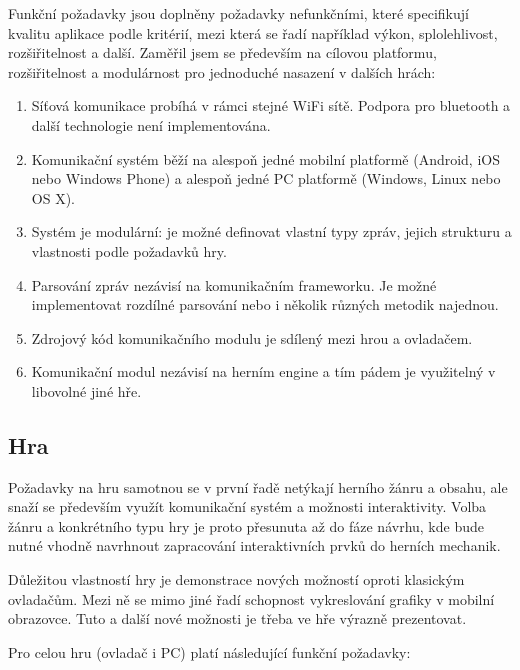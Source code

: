 \documentclass[thesis=B,czech,hidelinks]{FITthesis}[2012/06/26] %
\begin{document}
Funkční požadavky jsou doplněny požadavky nefunkčními, které specifikují kvalitu aplikace podle kritérií, mezi která se řadí například výkon, splolehlivost, rozšiřitelnost a další. Zaměřil jsem se především na cílovou platformu, rozšiřitelnost a modulárnost pro jednoduché nasazení v dalších hrách:

\begin{enumerate}
	\item Síťová komunikace probíhá v rámci stejné WiFi sítě. Podpora pro bluetooth a další technologie není implementována.
	\item Komunikační systém běží na alespoň jedné mobilní platformě (Android, iOS nebo Windows Phone) a alespoň jedné PC platformě (Windows, Linux nebo OS X).
	\item Systém je modulární: je možné definovat vlastní typy zpráv, jejich strukturu a vlastnosti podle požadavků hry.
	\item Parsování zpráv nezávisí na komunikačním frameworku. Je možné implementovat rozdílné parsování nebo i několik různých metodik najednou.
	\item Zdrojový kód komunikačního modulu je sdílený mezi hrou a ovladačem.
	\item Komunikační modul nezávisí na herním engine a tím pádem je využitelný v libovolné jiné hře.
\end{enumerate}

\subsection{Hra}

Požadavky na hru samotnou se v první řadě netýkají herního žánru a obsahu, ale snaží se především využít komunikační systém a možnosti interaktivity. Volba žánru a konkrétního typu hry je proto přesunuta až do fáze návrhu, kde bude nutné vhodně navrhnout zapracování interaktivních prvků do herních mechanik.

Důležitou vlastností hry je demonstrace nových možností oproti klasickým ovladačům. Mezi ně se mimo jiné řadí schopnost vykreslování grafiky v mobilní obrazovce. Tuto a další nové možnosti je třeba ve hře 
výrazně prezentovat.

Pro celou hru (ovladač i PC) platí následující funkční požadavky:
\end{document}
